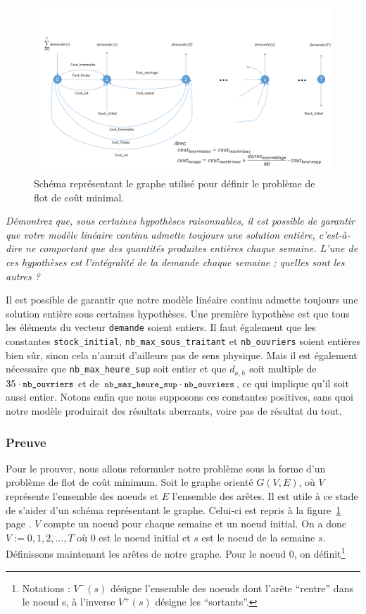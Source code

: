 \begin{figure}[H]
	\centering
		\includegraphics[scale = 0.7, angle = 90]{img/Schema_flot.png}
	\caption{Schéma représentant le graphe utilisé pour définir 
  le problème de flot de coût minimal.}
	\label{fig:schemaFlot}
\end{figure}

\question %
\emph{Démontrez que, sous certaines hypothèses raisonnables, 
il est possible de garantir que votre modèle linéaire continu admette toujours
une solution entière, c'est-à-dire ne comportant que des quantités produites
entières chaque semaine. 
L'une de ces hypothèses est l'intégralité de la demande chaque semaine ; 
quelles sont les autres ?}

Il est possible de garantir que notre modèle linéaire continu
admette toujours une solution entière sous certaines hypothèses.
Une première hypothèse est que tous les éléments du 
vecteur \texttt{demande} soient entiers.
Il faut également que les constantes \texttt{stock\_initial}, \texttt{nb\_max\_sous\_traitant} et 
\texttt{nb\_ouvriers} soient entières bien sûr, sinon cela n'aurait d'ailleurs pas de sens physique.
Mais il est également nécessaire que \texttt{nb\_max\_heure\_sup} soit entier et que $d_{a,h}$ soit multiple de $35\cdot {\small\texttt{nb\_ouvriers}}$ et de ${\small\texttt{nb\_max\_heure\_sup}}\cdot{\small\texttt{nb\_ouvriers}}$, ce qui implique qu'il soit aussi entier.
Notons enfin que nous supposons ces constantes positives, sans quoi notre modèle produirait des résultats aberrants,
voire pas de résultat du tout.

\subsubsection*{Preuve}
Pour le prouver, nous allons reformuler notre problème sous la forme d'un problème de flot de coût minimum.
Soit le graphe orienté $G(V,E)$, 
où $V$ représente l'ensemble des noeuds et $E$ l'ensemble des arêtes.
Il est utile à ce stade de s'aider d'un schéma représentant le graphe. 
Celui-ci est repris à la figure~\ref{fig:schemaFlot} page \pageref{fig:schemaFlot}.
$V$ compte un noeud pour chaque semaine et un noeud initial.
On a donc $V := {0, 1, 2, ..., T}$
où $0$ est le noeud initial et $s$ est le noeud de la semaine $s$.
Définissons maintenant les arêtes de notre graphe.
Pour le noeud $0$, on définit\footnote{Notations : $V^{-}(s)$ désigne l'ensemble des noeuds dont l'arête ``rentre'' dans le noeud s, à l'inverse $V^{+}(s)$ désigne les ``sortants''.}

